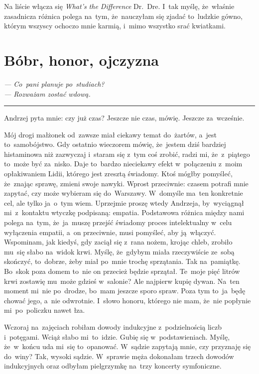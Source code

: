 \documentclass[9pt, a5paper]{memoir}
\begin{document}
Na liście włącza się \textit{What's the Difference} Dr.~Dre. I~tak myślę, że~właśnie zasadnicza różnica polega na~tym, że~nauczyłam się zjadać to~ludzkie gówno, którym wszyscy ochoczo mnie karmią, i~mimo wszystko srać kwiatkami.

\newpage
\section{Bóbr, honor, ojczyzna}
{
\itshape
--- Co~pani planuje po~studiach?\\
--- Rozważam zostać wdową.
}

\fancybreak{* \quad * \quad *}

Andrzej pyta mnie: czy już czas? Jeszcze nie czas, mówię. Jeszcze za~wcześnie.

Mój drogi małżonek od~zawsze miał ciekawy temat do~żartów, a~jest to~samobójstwo. Gdy ostatnio wieczorem mówię, że~jestem dziś bardziej histaminowa niż zazwyczaj i~staram się z~tym coś zrobić, radzi mi, że~z~piątego to~może być za~nisko. Daje to~bardzo nieciekawy efekt w~połączeniu z~moim opłakiwaniem Lidii, którego jest zresztą świadomy. Ktoś mógłby pomyśleć, że~znając sprawę, zmieni swoje nawyki. Wprost przeciwnie: czasem potrafi mnie zapytać, czy może wybieram się do~Warszawy. W~domyśle ma~ten konkretnie cel, ale tylko ja~o~tym wiem. Uprzejmie proszę wtedy Andrzeja, by~wyciągnął mi~z~kontaktu wtyczkę podpisaną: empatia. Podstawowa różnica między nami polega na~tym, że~ja~muszę przejść świadomy proces intelektualny w~celu wyłączenia empatii, a~on przeciwnie, musi pomyśleć, aby ją~włączyć. Wspominam, jak kiedyś, gdy zaciął się z~rana nożem, krojąc chleb, zrobiło mu~się słabo na~widok krwi. Myślę, że~gdybym miała rzeczywiście ze~sobą skończyć, to~dobrze, żeby miał po~mnie trochę sprzątania. Tak na~pamiątkę. Bo~skok poza domem to~nie on przecież będzie sprzątał. Te~moje pięć litrów krwi zostawię mu~może gdzieś w~salonie? Ale najpierw kupię dywan. Na~ten moment mi~nie po~drodze, bo~mam jeszcze sporo spraw. Poza tym to~ja~będę chować jego, a~nie odwrotnie. I~słowo honoru, którego nie mam, że~nie popłynie mi~po~policzku nawet łza.

Wczoraj na~zajęciach robiłam dowody indukcyjne z~podzielnością liczb i~potęgami. Wciąż słabo mi~to~idzie. Gubię się w~podstawieniach. Myślę, że~w~końcu uda mi~się to~opanować. W~sądzie zapytają mnie, czy przyznaję się do~winy? Tak, wysoki sądzie. W~sprawie męża dokonałam trzech dowodów indukcyjnych oraz odbyłam pielgrzymkę na~trzy koncerty symfoniczne.
\end{document}
